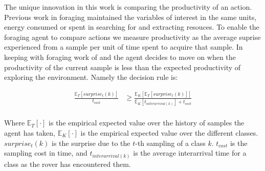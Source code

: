 The unique innovation in this work is comparing the productivity of an action.  Previous work in foraging maintained the variables of interest in the same units, energy consumed or spent in searching for and extracting resouces.  To enable the foraging agent to compare actions we measure productivity as the average suprise experienced from a sample per unit of time spent to acquire that sample.  In keeping with foraging work of \cite{charnov1973optimal} and \cite{pirolli1999information} the agent decides to move on when the productivity of the current sample is less than the expected productivity of exploring the environment.  Namely the decision rule is:

\begin{align*}
	\frac{\mathbb{E}_{T}\left[surprise_{t}\left(k\right)\right]}{t_{cost}} &\geq \frac{\mathbb{E}_{K}\left[\mathbb{E}_{T}\left[surprise_{t}\left(k\right)\right]\right]}{\mathbb{E}_{K}\left[t_{interarrival(k)}\right] + t_{cost}}\\
\end{align*}

Where $\mathbb{E}_{T}\left[\cdot\right]$ is the empirical expected value over the history of samples the agent has taken, $\mathbb{E}_{K}\left[\cdot\right]$ is the empirical expected value over the different classes. $surprise_{t}(k)$ is the surprise due to the $t$-th sampling of a class $k$.  $t_{cost}$ is the sampling cost in time, and $t_{interarrival(k)}$ is the average interarrival time for a class as the rover has encountered them.



% 
% 


